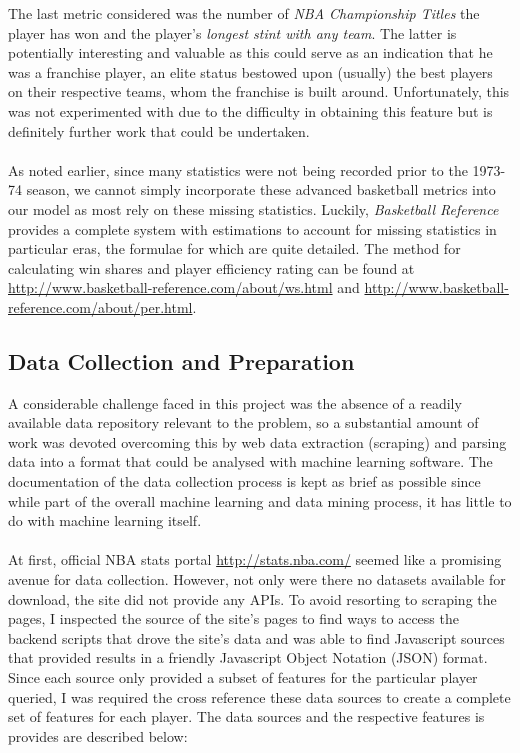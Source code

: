 \documentclass[paper=a4, fontsize=11pt]{scrartcl} %
\numberwithin{equation}{section} %
\numberwithin{figure}{section} %
\numberwithin{table}{section} %
\begin{document}
The last metric considered was the number of \textit{NBA Championship Titles} the player has won and the player's \textit{longest stint with any team}. The latter is potentially interesting and valuable as this could serve as an indication that he was a franchise player, an elite status bestowed upon (usually) the best players on their respective teams, whom the franchise is built around. Unfortunately, this was not experimented with due to the difficulty in obtaining this feature but is definitely further work that could be undertaken.\\
\\
As noted earlier, since many statistics were not being recorded prior to the 1973-74 season, we cannot simply incorporate these advanced basketball metrics into our model as most rely on these missing statistics. Luckily, \textit{Basketball Reference} provides a complete system with estimations to account for 	missing statistics in particular eras, the formulae for which are quite detailed. The method for calculating win shares and player efficiency rating can be found at \url{http://www.basketball-reference.com/about/ws.html} and \url{http://www.basketball-reference.com/about/per.html}.\\

\subsection{Data Collection and Preparation}

A considerable challenge faced in this project was the absence of a readily available data repository relevant to the problem, so a substantial amount of work was devoted overcoming this by web data extraction (scraping) and parsing data into a format that could be analysed with machine learning software. The documentation of the data collection process is kept as brief as possible since while part of the overall machine learning and data mining process, it has little to do with machine learning itself.\\
\\
At first, official NBA stats portal \url{http://stats.nba.com/} seemed like a promising avenue for data collection. However, not only were there no datasets available for download, the site did not provide any APIs. To avoid resorting to scraping the pages, I inspected the source of the site's pages to find ways to access the backend scripts that drove the site's data and was able to find Javascript sources that provided results in a friendly Javascript Object Notation (JSON) format. Since each source only provided a subset of features for the particular player queried, I was required the cross reference these data sources to create a complete set of features for each player. The data sources and the respective features is provides are described below:
\end{document}
